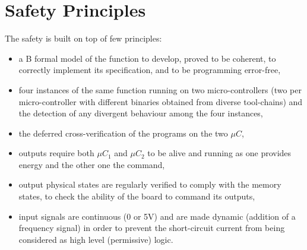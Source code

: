 \section{Safety Principles}
\label{safety:safety-principles}

The safety is built on top of few principles:
\begin{itemize}
    \item a B formal model of the function to develop, proved to be coherent, to correctly implement its specification, and to be programming error-free,
    \item four instances of the same function running on two micro-controllers (two per micro-controller with different binaries obtained from diverse tool-chains) and the detection of any divergent behaviour among the four instances,
    \item the deferred cross-verification of the programs on the two $\mu C$,
    \item outputs require both $\mu C_1$ and $\mu C_2$ to be alive and running as one provides energy and the other one the command,
    \item output physical states are regularly verified to comply with the memory states, to check the ability of the board to command its outputs,
    \item input signals are continuous (0 or 5V) and are made dynamic (addition of a frequency signal) in order to prevent the short-circuit current from being considered  as high level (permissive) logic.
\end{itemize}

